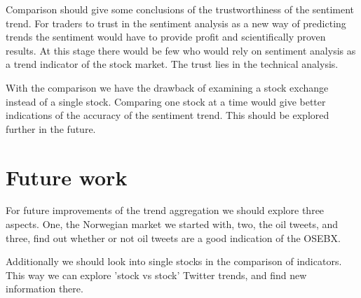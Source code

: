 Comparison should give some conclusions of the trustworthiness of the
sentiment trend. For traders to trust in the sentiment analysis as a new way of
predicting trends the sentiment would have to provide profit and scientifically
proven results. At this stage there would be few who would rely on sentiment
analysis as a trend indicator of the stock market. The trust lies in the
technical analysis.  

With the comparison we have the drawback of examining a stock exchange instead
of a single stock. Comparing one stock at a time would give better indications of
the accuracy of the sentiment trend. This should be explored further in the
future.   
%

\section{Future work}
For future improvements of the trend aggregation we should explore three aspects.
One, the Norwegian market we started with, two, the oil tweets, and three, find
out whether or not oil tweets are a good indication of the OSEBX. 

Additionally we should look into single stocks in the comparison of indicators.
This way we can explore 'stock vs stock' Twitter trends, and find new information
there.
%
